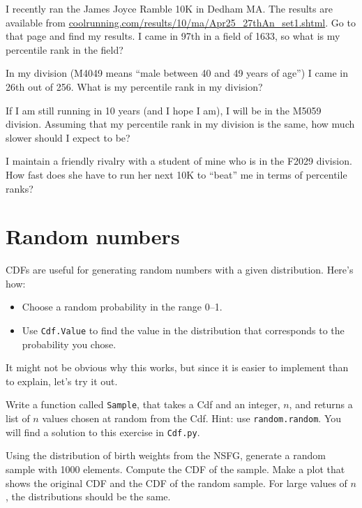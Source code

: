 \documentclass[12pt]{book}
\begin{document}
\begin{exercise}
I recently ran the James Joyce Ramble 10K
in Dedham MA.  The results are available from
\url{coolrunning.com/results/10/ma/Apr25_27thAn_set1.shtml}.
Go to that page and find my results.  I came in 97th in a field
of 1633, so what is my percentile rank in the field?


In my division (M4049 means ``male between 40 and 49 years of age'')
I came in 26th out of 256.  What is my percentile rank in my division?

If I am still running in 10 years (and I hope I am), I will be in
the M5059 division.  Assuming that my percentile rank in my division
is the same, how much slower should I expect to be?

I maintain a friendly rivalry with a student of mine who is in the
F2029 division.  How fast does she have to run her next 10K to
``beat'' me in terms of percentile ranks?

\end{exercise}


\section{Random numbers}
\label{random}

CDFs are useful for generating random numbers with a given
distribution.  Here's how:

\begin{itemize}

\item Choose a random probability in the range 0--1.

\item Use {\tt Cdf.Value} to find the value in the distribution
that corresponds to the probability you chose.

\end{itemize}

It might not be obvious why this works, but since it is easier
to implement than to explain, let's try it out.

\begin{exercise}
Write a function called {\tt Sample}, that takes a Cdf and
an integer, $n$, and returns a list of $n$ values chosen at
random from the Cdf.  Hint: use {\tt random.random}.
You will find a solution to this exercise in {\tt Cdf.py}.



Using the distribution of birth weights from the NSFG, generate a
random sample with 1000 elements.  Compute the CDF of the sample.
Make a plot that shows the original CDF and the CDF of the random
sample.  For large values of $n$, the distributions should be
the same.


\end{exercise}
\end{document}
